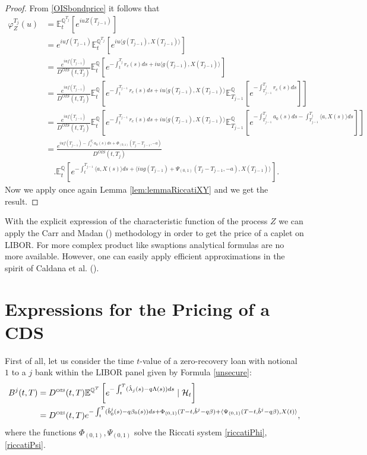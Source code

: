 \documentclass[12pt,a4paper]{article}
\theoremstyle{plain}
\numberwithin{equation}{section}
\begin{document}
\begin{proof}
From \eqref{OISbondprice} it follows that
\begin{align*}
\varphi^{T_j}_Z(u)&=\mathbb{E}_t^{\mathbb{Q}^{T_j}}\left[e^{iuZ (T_{j-1})}\right]\\
&= e^{iuf(T_{j-1})}\mathbb{E}_t^{\mathbb{Q}^{T_j}}\left[e^{iu\langle g(T_{j-1}), X({T_{j-1}})\rangle}\right]\\
&= \frac{e^{iuf(T_{j-1})}}{D^{OIS}(t,T_j)}
\mathbb{E}_t^{\mathbb{Q}}\left[e^{-\int_t^{T_j}r_c(s)ds
+iu\langle g(T_{j-1}), X({T_{j-1}})\rangle}\right]\\
&= \frac{e^{iuf(T_{j-1})}}{D^{OIS}(t,T_j)}
\mathbb{E}_t^{\mathbb{Q}}\left[e^{-\int_t^{T_{j-1}}r_c(s)ds
+iu\langle g(T_{j-1}), X({T_{j-1}})\rangle}
\mathbb{E}_{T_{j-1}}^{\mathbb{Q}}\left[e^{-\int_{T_{j-1}}^{T_{j}}r_c(s)ds}\right]\right]\\
&= \frac{e^{iuf(T_{j-1})}}{D^{OIS}(t,T_j)}
\mathbb{E}_t^{\mathbb{Q}}\left[e^{-\int_t^{T_{j-1}}r_c(s)ds
+iu\langle g(T_{j-1}), X({T_{j-1}})\rangle}
\mathbb{E}_{T_{j-1}}^{\mathbb{Q}}\left[e^{-\int_{T_{j-1}}^{T_{j}}a_0(s)ds-\int_{T_{j-1}}^{T_{j}}\langle a,X(s)\rangle ds}\right]\right]\\
&= \frac{e^{iuf(T_{j-1})-\int_t^{T_{j}}a_0(s)ds+\Phi_{(0,1)}(T_{j}-T_{j-1},-a)}}{D^{OIS}(t,T_j)}\\
&\quad .
 \mathbb{E}_t^{\mathbb{Q}}\left[e^{-\int_t^{T_{j-1}}\langle a,X(s)\rangle ds+\langle iug(T_{j-1})+\Psi_{(0,1)}(T_{j}-T_{j-1},-a),X(T_{j-1})\rangle}
\right].
\end{align*}
Now we apply once again Lemma \ref{lem:lemmaRiccatiXY} and we get the result.
\end{proof}

With the explicit expression of the characteristic function of the process $Z$ we can apply the Carr and Madan (\citeyear*{CarrMadan:1999}) methodology in order to get the price of a caplet on LIBOR.
For more complex product like swaptions analytical formulas are no more available. However, one can easily apply efficient approximations in the spirit of Caldana et al. (\citeyear*{cfgg14}).


\section{Expressions for the Pricing of a CDS}\label{CDS}

First of all, let us consider the time $t$-value of a zero-recovery loan with notional $1$ to  a $j$ bank within the LIBOR panel  given by Formula \eqref{unsecure}:
\begin{eqnarray}
\begin{aligned}
B^j(t,T)&=D^{\tiny \mbox{OIS}}(t,T)\mathbb{E}^{\mathbb{Q}^T}\left[ e^{-\int_t^{T}(\hat{\lambda}_j(s)-q\Lambda(s)) ds}\mid \mathcal{H}_t \right]\\
&=D^{\tiny \mbox{OIS}}(t,T)
e^{-\int_t^T (\hat{b}_0^j(s)-q\beta_0(s))ds+ \Phi_{(0,1)}(T-t,\hat{b}^j-q\beta)+\langle \Psi_{(0,1)}(T-t,\hat{b}^j-q\beta),X(t)\rangle },
\end{aligned}
\end{eqnarray}
where the functions $\Phi_{(0,1)},\Psi_{(0,1)}$ solve the Riccati system \eqref{riccatiPhi}, \eqref{riccatiPsi}.
\end{document}
